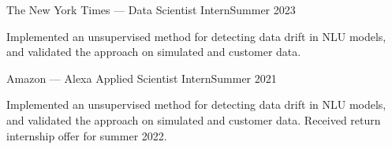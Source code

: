   {The New York Times --- Data Scientist Intern}{Summer 2023}

\vspace{0.15em}

Implemented an unsupervised method for detecting data drift in NLU models, and
validated the approach on simulated and customer data.

\vspace{0.15em}

  {Amazon --- Alexa Applied Scientist Intern}{Summer 2021}

\vspace{0.15em}

Implemented an unsupervised method for detecting data drift in NLU models, and
validated the approach on simulated and customer data. Received return internship offer for summer 2022.
